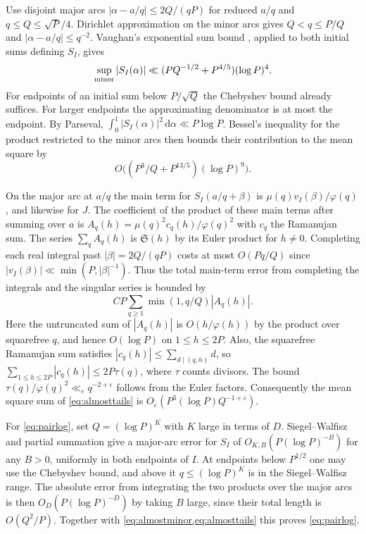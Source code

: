 \documentclass[11pt,a4paper]{article}
\numberwithin{equation}{section}
\newcommand{\SSS}{\mathfrak S}
\newcommand{\ud}{\mathrm d}
\begin{document}
Use disjoint major arcs $|\alpha-a/q|\le2Q/(qP)$ for reduced
$a/q$ and $q\le Q\le\sqrt P/4$. Dirichlet approximation on the
minor arcs gives $Q<q\le P/Q$ and $|\alpha-a/q|\le q^{-2}$.
Vaughan's exponential sum bound \cite{VaughanExp}, applied to
both initial sums defining $S_I$, gives
\[
 \sup_{\rm minor}|S_I(\alpha)|
     \ll (P Q^{-1/2}+P^{4/5})(\log P)^4.
\]
For endpoints of an initial sum below $P/\sqrt Q$ the Chebyshev
bound already suffices. For larger endpoints the approximating
denominator is at most the endpoint. By Parseval,
$\int_0^1|S_I(\alpha)|^2\,\ud\alpha\ll P\log P$.
Bessel's inequality for the product restricted to the minor arcs
then bounds their contribution to the mean square by
\begin{equation}
         O\bigl((P^3/Q+P^{13/5})(\log P)^9\bigr).
 \label{eq:almostminor}
\end{equation}

On the major arc at $a/q$ the main term for $S_I(a/q+\beta)$
is $\mu(q)v_I(\beta)/\varphi(q)$, and likewise for $J$.
The coefficient of the product of these
main terms after summing over $a$ is
$A_q(h)=\mu(q)^2c_q(h)/\varphi(q)^2$ with $c_q$ the Ramanujan
sum. The series $\sum_q A_q(h)$ is $\SSS(h)$ by its Euler
product for $h\ne0$. Completing each real integral past
$|\beta|=2Q/(qP)$ costs at most $O(Pq/Q)$ since
$|v_I(\beta)|\ll\min(P,|\beta|^{-1})$. Thus the total main-term
error from completing the integrals and the singular series is
bounded by
\begin{equation}
  C P\sum_{q\ge1}\min(1,q/Q)|A_q(h)|.
  \label{eq:almosttails}
\end{equation}
Here the untruncated sum of $|A_q(h)|$ is $O(h/\varphi(h))$
by the product over squarefree $q$, and hence $O(\log P)$ on
$1\le h\le2P$. Also, the squarefree Ramanujan sum satisfies
$|c_q(h)|\le\sum_{d\mid(q,h)}d$, so
$\sum_{1\le h\le2P}|c_q(h)|\le2P\tau(q)$, where $\tau$ counts
divisors. The bound $\tau(q)/\varphi(q)^2\ll_\varepsilon
q^{-2+\varepsilon}$ follows from the Euler factors. Consequently
the mean square sum of \cref{eq:almosttails} is
$O_\varepsilon(P^3(\log P)Q^{-1+\varepsilon})$.

For \cref{eq:pairlog}, set $Q=(\log P)^K$ with $K$ large
in terms of $D$. Siegel--Walfisz \cite{Walfisz} and partial
summation give a major-arc error for $S_I$ of
$O_{K,B}(P(\log P)^{-B})$ for any $B>0$, uniformly in both
endpoints of $I$. At endpoints below $P^{1/2}$ one may use the
Chebyshev bound, and above it $q\le (\log P)^K$ is in the
Siegel--Walfisz range. The absolute error from integrating the two
products over the major arcs is then $O_D(P(\log P)^{-D})$
by taking $B$ large, since their total length is $O(Q^2/P)$.
Together with \cref{eq:almostminor,eq:almosttails} this proves
\cref{eq:pairlog}.
\end{document}

